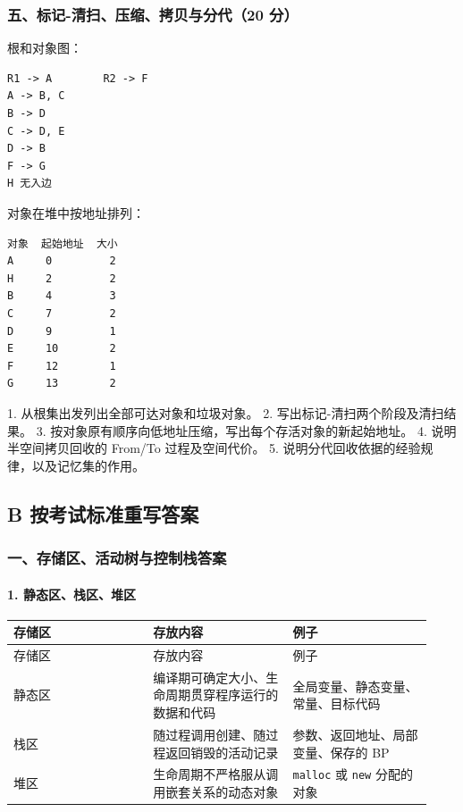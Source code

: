 \documentclass[UTF8]{ctexart}
\begin{document}
\subsubsection*{五、标记-清扫、压缩、拷贝与分代（20 分）}

根和对象图：

\begin{Verbatim}[fontsize=\small,breaklines=true]
R1 -> A        R2 -> F
A -> B, C
B -> D
C -> D, E
D -> B
F -> G
H 无入边
\end{Verbatim}

对象在堆中按地址排列：

\begin{Verbatim}[fontsize=\small,breaklines=true]
对象  起始地址  大小
A     0         2
H     2         2
B     4         3
C     7         2
D     9         1
E     10        2
F     12        1
G     13        2
\end{Verbatim}

1. 从根集出发列出全部可达对象和垃圾对象。 2. 写出标记-清扫两个阶段及清扫结果。 3. 按对象原有顺序向低地址压缩，写出每个存活对象的新起始地址。 4. 说明半空间拷贝回收的 From/To 过程及空间代价。 5. 说明分代回收依据的经验规律，以及记忆集的作用。

\subsection*{B 按考试标准重写答案}

\subsubsection*{一、存储区、活动树与控制栈答案}

\paragraph*{1. 静态区、栈区、堆区}

\begin{longtable}{|p{0.31\linewidth}|p{0.31\linewidth}|p{0.31\linewidth}|}
\hline
存储区 & 存放内容 & 例子 \\
\hline
\endfirsthead
存储区 & 存放内容 & 例子 \\
\hline
\endhead
静态区 & 编译期可确定大小、生命周期贯穿程序运行的数据和代码 & 全局变量、静态变量、常量、目标代码 \\
\hline
栈区 & 随过程调用创建、随过程返回销毁的活动记录 & 参数、返回地址、局部变量、保存的 BP \\
\hline
堆区 & 生命周期不严格服从调用嵌套关系的动态对象 & \texttt{malloc} 或 \texttt{new} 分配的对象 \\
\hline
\end{longtable}
\end{document}
